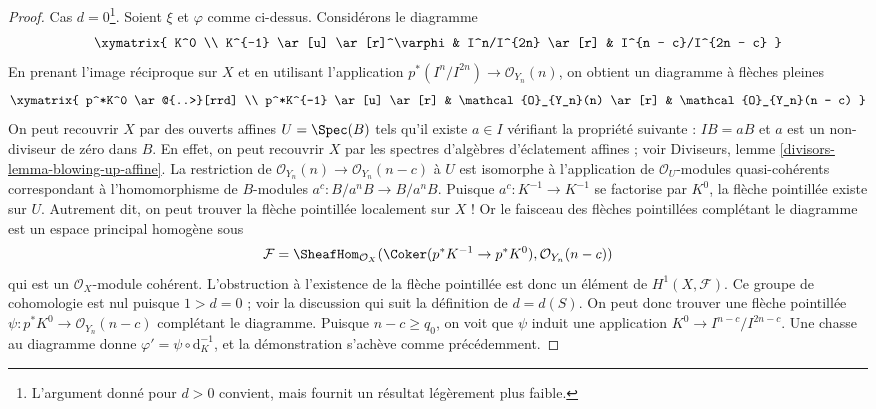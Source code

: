 \begin{proof}
\medskip\noindent
Cas $d = 0$\footnote{L'argument donné pour $d > 0$ convient, mais fournit un résultat légèrement plus faible.}. Soient $\xi$ et $\varphi$ comme ci-dessus. Considérons le diagramme
$$
\xymatrix{
K^0 \\
K^{-1} \ar[u] \ar[r]^\varphi & I^n/I^{2n} \ar[r] & I^{n - c}/I^{2n - c}
}
$$
En prenant l'image réciproque sur $X$ et en utilisant l'application $p^*(I^n/I^{2n}) \to \mathcal{O}_{Y_n}(n)$, on obtient un diagramme à flèches pleines
$$
\xymatrix{
p^*K^0 \ar@{..>}[rrd] \\
p^*K^{-1} \ar[u] \ar[r] &
\mathcal{O}_{Y_n}(n) \ar[r] &
\mathcal{O}_{Y_n}(n - c)
}
$$
On peut recouvrir $X$ par des ouverts affines $U = \Spec(B)$ tels qu'il existe $a \in I$ vérifiant la propriété suivante : $IB = aB$ et $a$ est un non-diviseur de zéro dans $B$. En effet, on peut recouvrir $X$ par les spectres d'algèbres d'éclatement affines ; voir Diviseurs, lemme \ref{divisors-lemma-blowing-up-affine}. La restriction de $\mathcal{O}_{Y_n}(n) \to \mathcal{O}_{Y_n}(n - c)$ à $U$ est isomorphe à l'application de $\mathcal{O}_U$-modules quasi-cohérents correspondant à l'homomorphisme de $B$-modules $a^c : B/a^nB \to B/a^nB$. Puisque $a^c : K^{-1} \to K^{-1}$ se factorise par $K^0$, la flèche pointillée existe sur $U$. Autrement dit, on peut trouver la flèche pointillée localement sur $X$ ! Or le faisceau des flèches pointillées complétant le diagramme est un espace principal homogène sous
$$
\mathcal{F} = \SheafHom_{\mathcal{O}_X}(
\Coker(p^*K^{-1} \to p^*K^0), \mathcal{O}_{Y_n}(n - c))
$$
qui est un $\mathcal{O}_X$-module cohérent. L'obstruction à l'existence de la flèche pointillée est donc un élément de $H^1(X, \mathcal{F})$. Ce groupe de cohomologie est nul puisque $1 > d = 0$ ; voir la discussion qui suit la définition de $d = d(S)$. On peut donc trouver une flèche pointillée $\psi : p^*K^0 \to \mathcal{O}_{Y_n}(n - c)$ complétant le diagramme. Puisque $n - c \geq q_0$, on voit que $\psi$ induit une application $K^0 \to I^{n - c}/I^{2n - c}$. Une chasse au diagramme donne $\varphi' = \psi \circ \text{d}_K^{-1}$, et la démonstration s'achève comme précédemment.
\end{proof}












